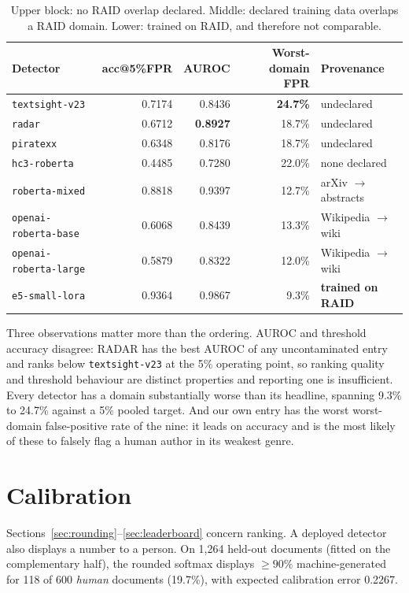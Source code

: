 \documentclass[11pt]{article}
\begin{document}
\begin{table}[h]
\centering
\begin{tabular}{lrrrl}
\toprule
Detector & acc@5\%FPR & AUROC & Worst-domain FPR & Provenance \\
\midrule
\texttt{textsight-v23}        & 0.7174 & 0.8436 & \textbf{24.7\%} & undeclared \\
\texttt{radar}                & 0.6712 & \textbf{0.8927} & 18.7\% & undeclared \\
\texttt{piratexx}             & 0.6348 & 0.8176 & 18.7\% & undeclared \\
\texttt{hc3-roberta}          & 0.4485 & 0.7280 & 22.0\% & none declared \\
\midrule
\texttt{roberta-mixed}        & 0.8818 & 0.9397 & 12.7\% & arXiv $\to$ abstracts \\
\texttt{openai-roberta-base}  & 0.6068 & 0.8439 & 13.3\% & Wikipedia $\to$ wiki \\
\texttt{openai-roberta-large} & 0.5879 & 0.8322 & 12.0\% & Wikipedia $\to$ wiki \\
\midrule
\texttt{e5-small-lora}        & 0.9364 & 0.9867 & 9.3\% & \textbf{trained on RAID} \\
\bottomrule
\end{tabular}
\caption{Upper block: no RAID overlap declared. Middle: declared training data
overlaps a RAID domain. Lower: trained on RAID, and therefore not comparable.}
\end{table}

Three observations matter more than the ordering. AUROC and threshold accuracy
disagree: RADAR has the best AUROC of any uncontaminated entry and ranks below
\texttt{textsight-v23} at the 5\% operating point, so ranking quality and
threshold behaviour are distinct properties and reporting one is insufficient.
Every detector has a domain substantially worse than its headline, spanning 9.3\%
to 24.7\% against a 5\% pooled target. And our own entry has the worst
worst-domain false-positive rate of the nine: it leads on accuracy and is the
most likely of these to falsely flag a human author in its weakest genre.

\section{Calibration}

Sections~\ref{sec:rounding}--\ref{sec:leaderboard} concern ranking. A deployed
detector also displays a number to a person. On 1{,}264 held-out documents
(fitted on the complementary half), the rounded softmax displays $\geq 90\%$
machine-generated for 118 of 600 \emph{human} documents (19.7\%), with expected
calibration error 0.2267.
\end{document}
